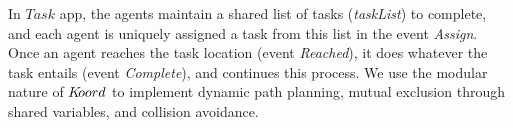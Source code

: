In $\mathit{Task}$ app, the agents maintain a shared list of tasks ({\em taskList}) to complete, and each agent is uniquely assigned a task from this list in the event {\em Assign}. Once an agent reaches the task location (event {\em Reached}), it does whatever the task entails (event {\em Complete}), and continues this process. We use the modular nature of $K\kern-2pt oord$ to implement dynamic path planning,  mutual exclusion through shared variables, and  collision avoidance.


